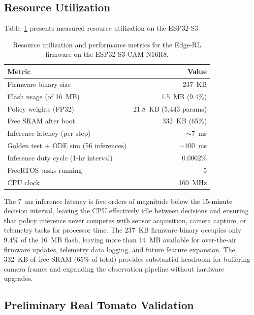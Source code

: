    \subsection{Resource Utilization}

    Table~\ref{tab:resource_util} presents measured resource utilization on the ESP32-S3.

    \begin{table}[ht]
        \caption{Resource utilization and performance metrics for the Edge-RL firmware on the ESP32-S3-CAM N16R8.}
        \label{tab:resource_util}
        \centering
        \begin{tabular}{lr}
            \hline
            \textbf{Metric} & \textbf{Value} \\
            \hline
            Firmware binary size & 237~KB \\
            Flash usage (of 16~MB) & 1.5~MB (9.4\%) \\
            Policy weights (FP32) & 21.8~KB (5,443 params) \\
            Free SRAM after boot & 332~KB (65\%) \\
            Inference latency (per step) & $\sim$7~ms \\
            Golden test + ODE sim (56 inferences) & $\sim$400~ms \\
            Inference duty cycle (1-hr interval) & 0.0002\% \\
            FreeRTOS tasks running & 5 \\
            CPU clock & 160~MHz \\
            \hline
        \end{tabular}
    \end{table}

    The 7~ms inference latency is five orders of magnitude below the 15-minute decision interval, leaving the CPU effectively idle between decisions and ensuring that policy inference never competes with sensor acquisition, camera capture, or telemetry tasks for processor time. The 237~KB firmware binary occupies only 9.4\% of the 16~MB flash, leaving more than 14~MB available for over-the-air firmware updates, telemetry data logging, and future feature expansion. The 332~KB of free SRAM (65\% of total) provides substantial headroom for buffering camera frames and expanding the observation pipeline without hardware upgrades.


    \subsection{Preliminary Real Tomato Validation}
    \label{subsec:real_tomato}

